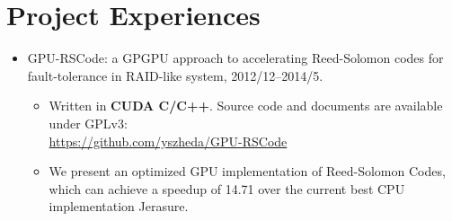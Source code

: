 \documentclass[letterpaper]{article}
\begin{document}
\section*{Project Experiences}
\begin{itemize}
    \item GPU-RSCode: a GPGPU approach to accelerating Reed-Solomon codes for fault-tolerance in RAID-like system, 2012/12--2014/5.
        \begin{itemize}
            \item Written in \textbf{CUDA C/C++}. Source code and documents are available under GPLv3: \\ \url{https://github.com/yszheda/GPU-RSCode}
            \item We present an optimized GPU implementation of Reed-Solomon Codes, which can achieve a speedup of 14.71 over the current best CPU implementation Jerasure.
        \end{itemize}

\end{itemize}
\end{document}
